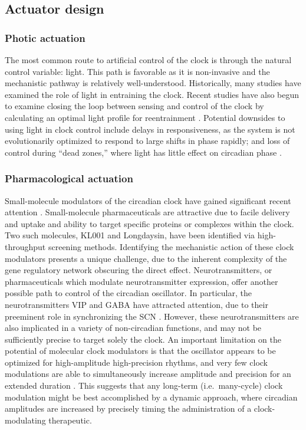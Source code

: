 \subsection*{Actuator design}
\subsubsection*{Photic actuation}
The most common route to artificial control of the clock is through the natural control variable: light.
This path is favorable as it is non-invasive and the mechanistic pathway is relatively well-understood.
Historically, many studies have examined the role of light in entraining the clock.
Recent studies have also begun to examine closing the loop between sensing and control of the clock by calculating an optimal light profile for reentrainment \cite{Serkh2014, Walch2016}.
Potential downsides to using light in clock control include delays in responsiveness, as the system is not evolutionarily optimized to respond to large shifts in phase rapidly; and loss of control during ``dead zones,'' where light has little effect on circadian phase \cite{Dunlap2004}.


\subsubsection*{Pharmacological actuation}
Small-molecule modulators of the circadian clock have gained significant recent attention \cite{Hirota2010, Hirota2012a, StJohn2014a}.
Small-molecule pharmaceuticals are attractive due to facile delivery and uptake and ability to target specific proteins or complexes within the clock.
Two such molecules, KL001 and Longdaysin, have been identified via high-throughput screening methods.
Identifying the mechanistic action of these clock modulators presents a unique challenge, due to the inherent complexity of the gene regulatory network obscuring the direct effect.
Neurotransmitters, or pharmaceuticals which modulate neurotransmitter expression, offer another possible path to control of the circadian oscillator.
In particular, the neurotransmitters VIP and GABA have attracted attention, due to their preeminent role in synchronizing the SCN \cite{An2013,Kingsbury2016}.
However, these neurotransmitters are also implicated in a variety of non-circadian functions, and may not be sufficiently precise to target solely the clock.
An important limitation on the potential of molecular clock modulators is that the oscillator appears to be optimized for high-amplitude high-precision rhythms, and very few clock modulations are able to simultaneously increase amplitude and precision for an extended duration \cite{StJohn2015}.
This suggests that any long-term (i.e.~many-cycle) clock modulation might be best accomplished by a dynamic approach, where circadian amplitudes are increased by precisely timing the administration of a clock-modulating therapeutic.



